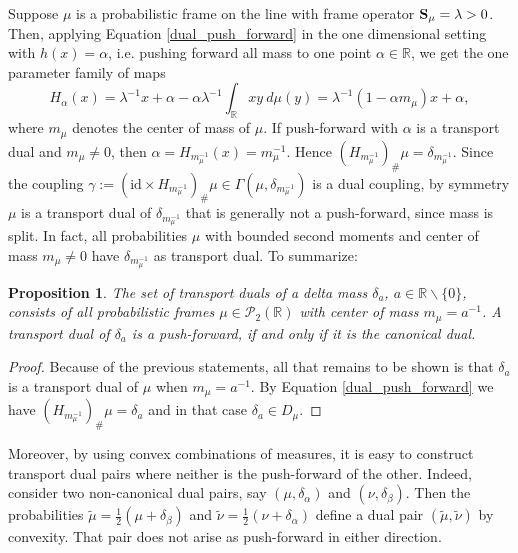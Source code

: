 \documentclass{amsart}
\numberwithin{equation}{section}
\newcommand\cP{{\mathcal P}}
\newcommand\bS{{\bf S}}
\newcommand\R{{\mathbb R}}
\theoremstyle{plain}
\newtheorem{proposition}[subsection]{Proposition}
\theoremstyle{definition}
\begin{document}
 Suppose $\mu$ is a probabilistic frame on the line with frame operator $\bS_{\mu}=\lambda >0 $. Then, applying Equation \ref{dual_push_forward} in the one dimensional setting with $h(x)=\alpha$, i.e. pushing forward all mass to one point $\alpha \in \R$, we get the one parameter family of maps
\begin{equation}\label{dual_push_forw}
    {H}_{\alpha}(x)=\lambda^{-1}x + \alpha - \alpha \lambda^{-1} \int_{\R} xy\ d \mu(y)=\lambda^{-1}(1-\alpha m_{\mu})x + \alpha,  
\end{equation}
where $m_{\mu}$ denotes the center of mass of $\mu$. If push-forward with $\alpha$ is a transport dual and  
$m_{\mu} \neq 0$, then $\alpha=H_{m_{\mu}^{-1}}(x)=m_{\mu}^{-1}$. Hence $(H_{m_{\mu}^{-1}})_{\#} \mu = \delta_{m_{\mu}^{-1}}$. 
Since the coupling $\gamma:=(\text{id} \times H_{m_{\mu}^{-1}})_{\#}\mu \in \Gamma(\mu, \delta_{m_{\mu}^{-1}})$
is a dual coupling, by symmetry $\mu$ is a transport dual of $\delta_{m_{\mu}^{-1}}$ that is generally not a push-forward, since
mass is split. In fact, all probabilities $\mu$ with bounded second moments and center of mass $m_{\mu} \neq 0$ have $\delta_{m_{\mu}^{-1}}$ 
as transport dual.  
To summarize: 
\begin{proposition} \label{one_dim_transport_duals}
The set of transport duals of a delta mass $\delta_{a}$, $a\in \R \backslash \{0\}$, consists of all probabilistic frames $\mu \in \cP_2(\R)$ with
center of mass $m_{\mu}=a^{-1}$. 
A transport dual of $\delta_{a}$ is a push-forward, if and only if it is the canonical dual.  
\end{proposition}
\begin{proof}
Because of the previous statements, all that remains to be shown is that $\delta_{a}$  is a transport dual of $\mu$ when $m_{\mu}=a^{-1}$. 
By Equation \ref{dual_push_forward} we have $(H_{m^{-1}_{\mu}})_{\#}\mu=\delta_{a}$ and in that case $\delta_{a} \in D_{\mu}$.  
\end{proof}
\noindent Moreover, by using convex combinations of measures, it is easy to construct transport dual pairs where neither is the push-forward of
the other. Indeed, consider two non-canonical dual pairs, say $(\mu, \delta_{\alpha})$ and $(\nu, \delta_{\beta})$.   
Then the probabilities $\widetilde{\mu} = \frac{1}{2}(\mu + \delta_{\beta})$ and $\widetilde{\nu} = \frac{1}{2}(\nu + \delta_{\alpha})$ 
define a dual pair $(\widetilde{\mu},\widetilde{\nu})$ by convexity. That pair does not arise as push-forward in either direction. \\
\end{document}
